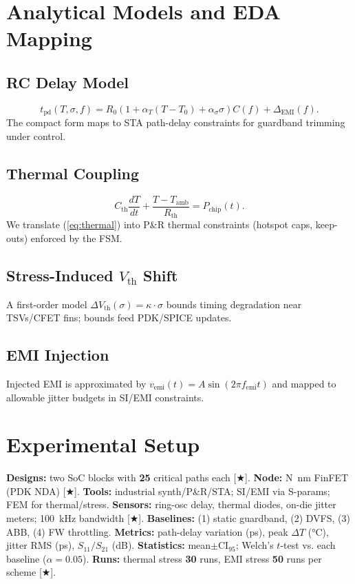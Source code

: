 \documentclass[conference]{IEEEtran}
\newcommand{\CI}{\mathrm{CI}_{95}}
\begin{document}
\section{Analytical Models and EDA Mapping}
\subsection{RC Delay Model}
\begin{equation}
t_{\mathrm{pd}}(T,\sigma,f) =
R_0\!\left(1+\alpha_T(T-T_0)+\alpha_\sigma\sigma\right) C(f)
+ \Delta_{\mathrm{EMI}}(f).
\label{eq:rc}
\end{equation}
The compact form maps to STA path-delay constraints for guardband trimming under control.

\subsection{Thermal Coupling}
\begin{equation}
C_{\mathrm{th}}\frac{dT}{dt} + \frac{T-T_{\mathrm{amb}}}{R_{\mathrm{th}}} = P_{\mathrm{chip}}(t).
\label{eq:thermal}
\end{equation}
We translate (\ref{eq:thermal}) into P\&R thermal constraints (hotspot caps, keep-outs) enforced by the FSM.

\subsection{Stress-Induced $V_{\mathrm{th}}$ Shift}
A first-order model $\Delta V_{\mathrm{th}}(\sigma)=\kappa\cdot\sigma$ bounds timing degradation near TSVs/CFET fins; bounds feed PDK/SPICE updates.

\subsection{EMI Injection}
Injected EMI is approximated by $v_{\mathrm{emi}}(t)=A\sin(2\pi f_{\mathrm{emi}}t)$ and mapped to allowable jitter budgets in SI/EMI constraints.

\section{Experimental Setup}
\label{sec:setup}
\textbf{Designs:} two SoC blocks with \textbf{25} critical paths each [★].  
\textbf{Node:} \SI{N}{\nano\meter} FinFET (PDK NDA) [★].  
\textbf{Tools:} industrial synth/P\&R/STA; SI/EMI via S-params; FEM for thermal/stress.  
\textbf{Sensors:} ring-osc delay, thermal diodes, on-die jitter meters; \SI{100}{\kilo\hertz} bandwidth [★].  
\textbf{Baselines:} (1) static guardband, (2) DVFS, (3) ABB, (4) FW throttling.  
\textbf{Metrics:} path-delay variation (ps), peak $\Delta T$ (\si{\celsius}), jitter RMS (ps), $S_{11}/S_{21}$ (dB).  
\textbf{Statistics:} mean$\pm\CI$; Welch's $t$-test vs. each baseline ($\alpha=0.05$).  
\textbf{Runs:} thermal stress \textbf{30} runs, EMI stress \textbf{50} runs per scheme [★].
\end{document}
